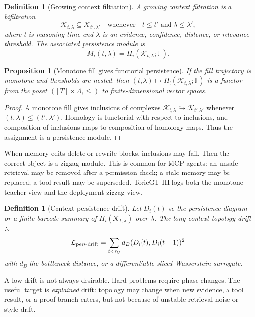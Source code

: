 \documentclass[11pt]{article}
\newtheorem{proposition}[theorem]{Proposition}
\newtheorem{definition}[theorem]{Definition}
\newcommand{\FF}{\mathbb{F}}
\newcommand{\calK}{\mathcal{K}}
\newcommand{\loss}{\mathcal{L}}
\numberwithin{equation}{section}
\begin{document}
\begin{definition}[Growing context filtration]
A growing context filtration is a bifiltration
\begin{equation}
\calK_{t,\lambda}\subseteq \calK_{t',\lambda'}\quad\text{whenever}\quad t\le t'\;\text{and}\;\lambda\le \lambda',
\end{equation}
where $t$ is reasoning time and $\lambda$ is an evidence, confidence, distance, or relevance threshold. The associated persistence module is
\begin{equation}
M_i(t,\lambda)=H_i(\calK_{t,\lambda};\FF).
\end{equation}
\end{definition}

\begin{proposition}[Monotone fill gives functorial persistence]
If the fill trajectory is monotone and thresholds are nested, then $(t,\lambda)\mapsto H_i(\calK_{t,\lambda};\FF)$ is a functor from the poset $([T]\times\Lambda,\le)$ to finite-dimensional vector spaces.
\end{proposition}
\begin{proof}
A monotone fill gives inclusions of complexes $\calK_{t,\lambda}\hookrightarrow \calK_{t',\lambda'}$ whenever $(t,\lambda)\le(t',\lambda')$. Homology is functorial with respect to inclusions, and composition of inclusions maps to composition of homology maps. Thus the assignment is a persistence module.
\end{proof}

When memory edits delete or rewrite blocks, inclusions may fail. Then the correct object is a zigzag module. This is common for MCP agents: an unsafe retrieval may be removed after a permission check; a stale memory may be replaced; a tool result may be superseded. ToricGT III logs both the monotone teacher view and the deployment zigzag view.

\begin{definition}[Context persistence drift]
Let $D_i(t)$ be the persistence diagram or a finite barcode summary of $H_i(\calK_{t,\lambda})$ over $\lambda$. The long-context topology drift is
\begin{equation}
\loss_{\rm pers\mbox{-}drift}=\sum_{t<\tau_C}d_B(D_i(t),D_i(t+1))^2
\end{equation}
with $d_B$ the bottleneck distance, or a differentiable sliced-Wasserstein surrogate.
\end{definition}
A low drift is not always desirable. Hard problems require phase changes. The useful target is \emph{explained} drift: topology may change when new evidence, a tool result, or a proof branch enters, but not because of unstable retrieval noise or style drift.
\end{document}
